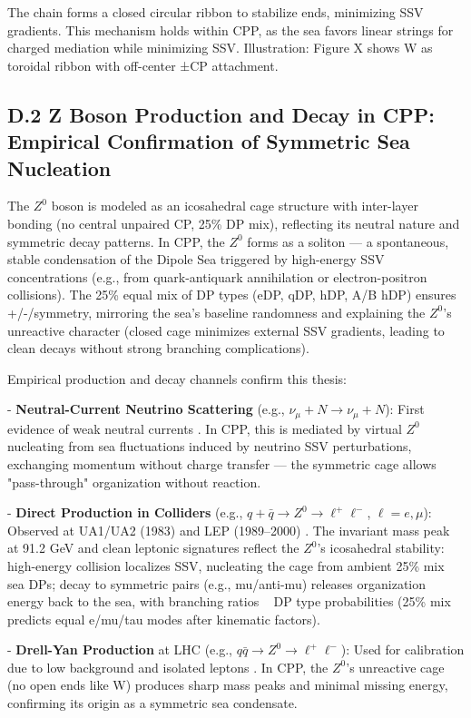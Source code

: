 \documentclass{article}
\begin{document}
The chain forms a closed circular ribbon to stabilize ends, minimizing SSV gradients. This mechanism holds within CPP, as the sea favors linear strings for charged mediation while minimizing SSV. Illustration: Figure X shows W as toroidal ribbon with off-center ±CP attachment.

\subsection{D.2 Z Boson Production and Decay in CPP: Empirical Confirmation of Symmetric Sea Nucleation}

The $Z^0$ boson is modeled as an icosahedral cage structure with inter-layer bonding (no central unpaired CP, 25\% DP mix), reflecting its neutral nature and symmetric decay patterns. In CPP, the $Z^0$ forms as a soliton — a spontaneous, stable condensation of the Dipole Sea triggered by high-energy SSV concentrations (e.g., from quark-antiquark annihilation or electron-positron collisions). The 25\% equal mix of DP types (eDP, qDP, hDP, A/B hDP) ensures +/-/symmetry, mirroring the sea's baseline randomness and explaining the $Z^0$'s unreactive character (closed cage minimizes external SSV gradients, leading to clean decays without strong branching complications).

Empirical production and decay channels confirm this thesis:

- \textbf{Neutral-Current Neutrino Scattering} (e.g., \(\nu_\mu + N \to \nu_\mu + N\)): First evidence of weak neutral currents \cite{gargamelle1973}. In CPP, this is mediated by virtual $Z^0$ nucleating from sea fluctuations induced by neutrino SSV perturbations, exchanging momentum without charge transfer — the symmetric cage allows "pass-through" organization without reaction.

- \textbf{Direct Production in Colliders} (e.g., \(q + \bar{q} \to Z^0 \to \ell^+ \ell^-\), \(\ell = e, \mu\)): Observed at UA1/UA2 (1983) \cite{ua11983} and LEP (1989–2000) \cite{lep1990}. The invariant mass peak at 91.2 GeV and clean leptonic signatures reflect the $Z^0$'s icosahedral stability: high-energy collision localizes SSV, nucleating the cage from ambient 25\% mix sea DPs; decay to symmetric pairs (e.g., mu/anti-mu) releases organization energy back to the sea, with branching ratios ~ DP type probabilities (25\% mix predicts equal e/mu/tau modes after kinematic factors).

- \textbf{Drell-Yan Production} at LHC (e.g., \(q \bar{q} \to Z^0 \to \ell^+ \ell^-\)): Used for calibration due to low background and isolated leptons \cite{lhc2011}. In CPP, the $Z^0$'s unreactive cage (no open ends like W) produces sharp mass peaks and minimal missing energy, confirming its origin as a symmetric sea condensate.
\end{document}
